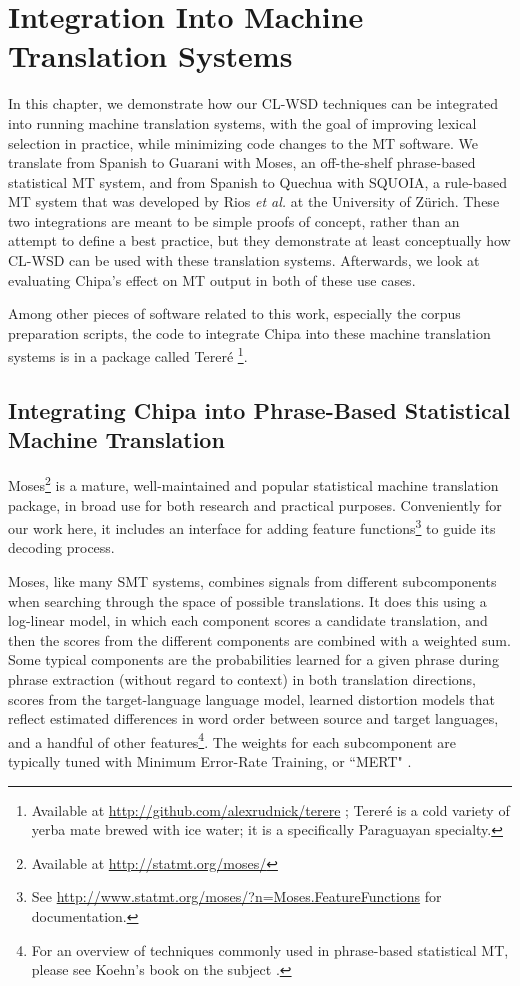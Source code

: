 \chapter{Integration Into Machine Translation Systems}
\label{chap:integration}
In this chapter, we demonstrate how our CL-WSD techniques can be integrated
into running machine translation systems, with the goal of improving lexical
selection in practice, while minimizing code changes to the MT software. We
translate from Spanish to Guarani with Moses\cite{koehn-EtAl:2007:PosterDemo},
an off-the-shelf phrase-based statistical MT system, and from Spanish to
Quechua with SQUOIA, a rule-based MT system that was developed by Rios \emph{et
al.} at the University of Zürich. These two integrations are meant to be simple
proofs of concept, rather than an attempt to define a best practice, but they
demonstrate at least conceptually how CL-WSD can be used with these translation
systems.  Afterwards, we look at evaluating Chipa's effect on MT output in both
of these use cases.

Among other pieces of software related to this work, especially the corpus
preparation scripts, the code to integrate Chipa into these machine
translation systems is in a package called Tereré \footnote{Available at
\url{http://github.com/alexrudnick/terere} ; Tereré is a cold variety of yerba
mate brewed with ice water; it is a specifically Paraguayan specialty.}.

\section{Integrating Chipa into Phrase-Based Statistical Machine Translation}
Moses\footnote{Available at
\url{http://statmt.org/moses/}} is a mature,
well-maintained and popular statistical machine translation package, in broad
use for both research and practical purposes. Conveniently for our work here,
it includes an interface for adding feature functions\footnote{See
\url{http://www.statmt.org/moses/?n=Moses.FeatureFunctions} for documentation.}
to guide its decoding process.

Moses, like many SMT systems, combines signals from different subcomponents
when searching through the space of possible translations. It does this using a
log-linear model, in which each component scores a candidate translation, and
then the scores from the different components are combined with a weighted sum.
Some typical components are the probabilities learned for a given phrase during
phrase extraction (without regard to context) in both translation directions,
scores from the target-language language model, learned distortion models that
reflect estimated differences in word order between source and target
languages, and a handful of other features\footnote{For an overview of
techniques commonly used in phrase-based statistical MT, please see Koehn's
book on the subject \cite{koehn2010statistical}.}. The weights for each
subcomponent are typically tuned with Minimum Error-Rate Training, or ``MERT"
\cite{och:2003:ACL}.

